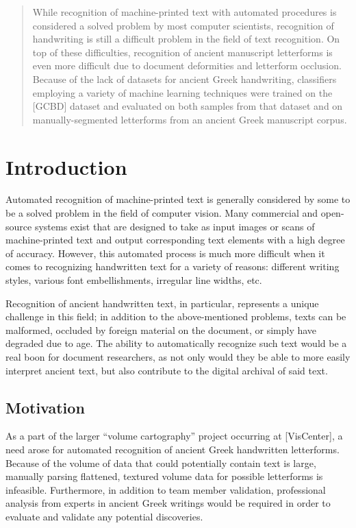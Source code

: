 \documentclass[10pt,twocolumn,letterpaper]{article}
\begin{document}
\begin{abstract}
    While recognition of machine-printed text with automated procedures is considered a solved problem by most computer scientists, recognition of handwriting is still a difficult problem in the field of text recognition. On top of these difficulties, recognition of ancient manuscript letterforms is even more difficult due to document deformities and letterform occlusion. Because of the lack of datasets for ancient Greek handwriting, classifiers employing a variety of machine learning techniques were trained on the [GCBD] dataset and evaluated on both samples from that dataset and on manually-segmented letterforms from an ancient Greek manuscript corpus.
\end{abstract}

\section{Introduction}

Automated recognition of machine-printed text is generally considered by some to be a solved problem in the field of computer vision. Many commercial and open-source systems exist that are designed to take as input images or scans of machine-printed text and output corresponding text elements with a high degree of accuracy. However, this automated process is much more difficult when it comes to recognizing handwritten text for a variety of reasons: different writing styles, various font embellishments, irregular line widths, etc.

Recognition of ancient handwritten text, in particular, represents a unique challenge in this field; in addition to the above-mentioned problems, texts can be malformed, occluded by foreign material on the document, or simply have degraded due to age. The ability to automatically recognize such text would be a real boon for document researchers, as not only would they be able to more easily interpret ancient text, but also contribute to the digital archival of said text.

\subsection{Motivation}

As a part of the larger “volume cartography” project occurring at [VisCenter], a need arose for automated recognition of ancient Greek handwritten letterforms.  Because of the volume of data that could potentially contain text is large, manually parsing flattened, textured volume data for possible letterforms is infeasible. Furthermore, in addition to team member validation, professional analysis from experts in ancient Greek writings would be required in order to evaluate and validate any potential discoveries.
\end{document}

